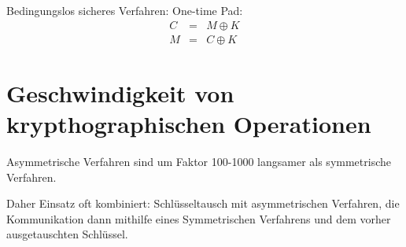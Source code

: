 Bedingungslos sicheres Verfahren: One-time Pad:
\begin{eqnarray*}
    C &=& M \oplus K \\
    M &=& C \oplus K 
\end{eqnarray*}

\section{Geschwindigkeit von krypthographischen Operationen}
Asymmetrische Verfahren sind um Faktor 100-1000 langsamer als symmetrische Verfahren.

Daher Einsatz oft kombiniert: Schlüsseltausch mit asymmetrischen Verfahren, die Kommunikation dann mithilfe eines Symmetrischen Verfahrens und dem vorher ausgetauschten Schlüssel.
